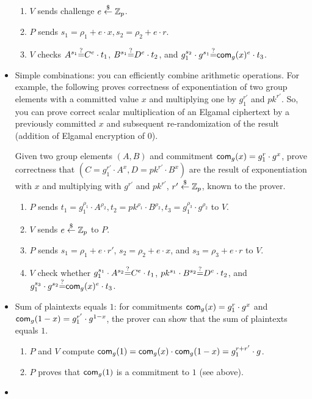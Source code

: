 \documentclass{article}
\begin{document}
\begin{itemize}
\begin{enumerate}
      \item $V$ sends challenge $e\stackrel{\$}{\leftarrow}\mathbb{Z}_p$.

      \item $P$ sends $s_1=\rho_1+e\cdot{}x,s_2=\rho_2+e\cdot{}r$.
        \item $V$ checks $A^{s_1}{\stackrel{?}{=}}{}C^e\cdot{}t_1$,
          $B^{s_1}{\stackrel{?}{=}}{}D^e\cdot{}t_2$, and
          $g_1^{s_2}\cdot{}g^{s_1}{\stackrel{?}{=}}{}\mathsf{com}_g(x)^e\cdot{}t_3$.
          
      \end{enumerate}   

    \item Simple combinations: you can efficiently combine arithmetic
      operations. For example, the following proves correctness of
      exponentiation of two group elements with a committed value $x$
      and multiplying one by $g_1^{r'}$ and $pk^{r'}$. So, you can
      prove correct scalar multiplication of an Elgamal ciphertext by
      a previously committed $x$ and subsequent re-randomization of
      the result (addition of Elgamal encryption of $0$).

      Given two group elements $(A,B)$ and commitment
      $\mathsf{com}_g(x) =g_1^{r}\cdot{}g^x$, prove correctness that
      $(C=g_1^{r'}\cdot{}A^x,D=pk^{r'}\cdot{}B^x)$ are the result of
      exponentiation with $x$ and multiplying with $g^{r'}$ and
      $pk^{r'}$, $r'\stackrel{\$}{\leftarrow}\mathbb{Z}_p$, known to the prover.

\begin{enumerate}
  \item $P$ sends $t_1=g_1^{\rho_1}\cdot{}A^{\rho_2},t_2=pk^{\rho_1}\cdot{}B^{\rho_2},t_3=g_1^{\rho_3}\cdot{}g^{\rho_2}$ to $V$.
  \item $V$ sends $e\stackrel{\$}{\leftarrow}\mathbb{Z}_p$ to $P$.
    \item $P$ sends $s_1=\rho_1+e\cdot{}r'$, $s_2=\rho_2+e\cdot{}x$,
      and $s_3=\rho_3+e\cdot{}r$ to $V$.
\item $V$ check whether $g_1^{s_1}\cdot{}A^{s_2}{\stackrel{?}{=}}{}C^e\cdot{}t_1$,
  $pk^{s_1}\cdot{}B^{s_2}{\stackrel{?}{=}}{}D^e\cdot{}t_2$, and
  $g_1^{s_3}\cdot{}g^{s_2}{\stackrel{?}{=}}{}\mathsf{com}_g(x)^e\cdot{}t_3$.
\end{enumerate}

\item Sum of plaintexts equals $1$: for commitments
  $\mathsf{com}_{g}(x)=g_1^r\cdot{}g^x$ and
  $\mathsf{com}_{g}(1-x)=g_1^{r'}\cdot{}g^{1-x}$, the prover can show that the sum of
  plaintexts equals $1$.

  \begin{enumerate}
  \item $P$ and $V$ compute
    $\mathsf{com}_{g}(1)=\mathsf{com}_{g}(x)\cdot{}\mathsf{com}_{g}(1-x)=g_1^{r+r'}\cdot{}g$.
\item $P$ proves that $\mathsf{com}_{g}(1)$ is a commitment to $1$ (see
  above).
  \end{enumerate}
\item {}
\end{itemize}
\end{document}
